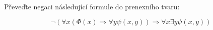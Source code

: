 Převeďte negaci následující formule do prenexního tvaru:

$$\neg(\forall x (\Phi (x) \Rightarrow \forall y \psi(x,y)) \Rightarrow \forall
x \exists y \psi(x,y))$$
